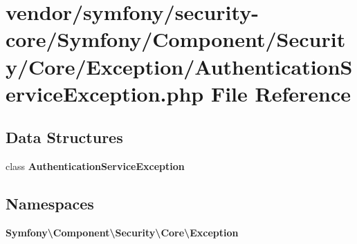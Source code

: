 \section{vendor/symfony/security-\/core/\+Symfony/\+Component/\+Security/\+Core/\+Exception/\+Authentication\+Service\+Exception.php File Reference}
\label{_authentication_service_exception_8php}
\subsection*{Data Structures}
\begin{DoxyCompactItemize}
\item 
class {\bf Authentication\+Service\+Exception}
\end{DoxyCompactItemize}
\subsection*{Namespaces}
\begin{DoxyCompactItemize}
\item 
 {\bf Symfony\textbackslash{}\+Component\textbackslash{}\+Security\textbackslash{}\+Core\textbackslash{}\+Exception}
\end{DoxyCompactItemize}
